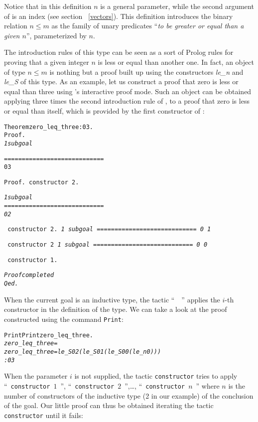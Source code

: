 \documentclass[11pt]{article}
\newcommand{\refmancite}[1]{{}}
\begin{document}
Notice that in this definition $n$ is a general parameter,
while the second argument of  is an index (see section
~\ref{vectors}).
 This definition
introduces the binary relation $n {\leq} m$ as the family of unary predicates
``\textsl{to be greater or equal than a given $n$}'', parameterized by $n$.

The introduction rules of this type can be seen as a sort of Prolog
rules for proving that a given integer $n$ is less or equal than another one.
In fact, an object of type $n{\leq} m$ is nothing but a proof 
built up using the constructors \textsl{le\_n} and
\textsl{le\_S} of this type.  As an example, let us construct
a proof that zero is less or equal than three using {\coq}'s interactive
proof mode.
Such an object can be obtained applying three times the second
introduction rule of , to a proof that zero is less or equal
than itself,
which is provided by the first constructor of :

\begin{alltt}
Theorem zero_leq_three: 0 {\coqle} 3.
Proof.
\it{} 1 subgoal

============================
 0 {\coqle} 3

\tt{}Proof.
 constructor 2. 

\it{} 1 subgoal
============================
  0 {\coqle} 2

\tt{} constructor 2.  
\it{} 1 subgoal
============================
  0 {\coqle} 1

\tt{} constructor 2
\it{} 1 subgoal
============================
  0 {\coqle} 0

\tt{} constructor 1.

\it{}Proof completed
\tt{}Qed.
\end{alltt}

\noindent When
the current goal is an inductive type, the tactic 
``~~'' \refmancite{Section \ref{constructor}} applies the $i$-th constructor in the
definition of the type. We can take a look at the proof constructed
using the command \texttt{Print}:

\begin{alltt}
Print Print zero_leq_three.
\it{}zero_leq_three = 
zero_leq_three = le_S 0 2 (le_S 0 1 (le_S 0 0 (le_n 0)))
     : 0 {\coqle} 3
\end{alltt}

When the parameter $i$ is not supplied, the tactic \texttt{constructor}
tries to apply ``~\texttt{constructor $1$}~'', ``~\texttt{constructor $2$}~'',\dots,
``~\texttt{constructor $n$}~'' where $n$ is the number of constructors
of the inductive type (2 in our example) of the conclusion of the goal.
Our little proof can thus be obtained iterating the tactic
\texttt{constructor} until it fails:
\end{document}
